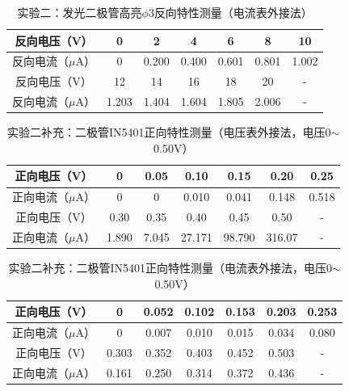 \documentclass[a4paper]{article}
\begin{document}
    \begin{table}[!ht]
        \caption{实验二：发光二极管高亮$\phi3$反向特性测量（电流表外接法）}\label{tab:exp4}
        \begin{tabularx}{\textwidth}{c*{6}{C}} \toprule
            反向电压（V） & 0 & 2 & 4 & 6 & 8 & 10 \\ \midrule
            反向电流（$\mu$A） & 0 & 0.200 & 0.400 & 0.601 & 0.801 & 1.002 \\ \midrule
            反向电压（V） & 12 & 14 & 16 & 18 & 20 & - \\ \midrule
            反向电流（$\mu$A） & 1.203 & 1.404 & 1.604 & 1.805 & 2.006 & - \\
        \bottomrule
        \end{tabularx}
    \end{table}
    \begin{table}[!ht]
        \caption{实验二补充：二极管IN5401正向特性测量（电压表外接法，电压0$\sim$0.50V）}\label{tab:exp4}
        \begin{tabularx}{\textwidth}{c*{6}{C}} \toprule
            正向电压（V） & 0 & 0.05 & 0.10 & 0.15 & 0.20 & 0.25 \\ \midrule
            正向电流（$\mu$A） & 0 & 0 & 0.010 & 0.041 & 0.148 & 0.518 \\ \midrule
            正向电压（V） & 0.30 & 0.35 & 0.40 & 0.45 & 0.50 & - \\ \midrule
            正向电流（$\mu$A） & 1.890 & 7.045 & 27.171 & 98.790 & 316.07 & - \\ 
        \bottomrule
        \end{tabularx}
    \end{table}
    \begin{table}[!ht]
        \caption{实验二补充：二极管IN5401正向特性测量（电流表外接法，电压0$\sim$0.50V）}\label{tab:exp4}
        \begin{tabularx}{\textwidth}{c*{6}{C}} \toprule
            正向电压（V） & 0 & 0.052 & 0.102 & 0.153 & 0.203 & 0.253 \\ \midrule
            正向电流（$\mu$A） & 0 & 0.007 & 0.010 & 0.015 & 0.034 & 0.080 \\ \midrule
            正向电压（V） & 0.303 & 0.352 & 0.403 & 0.452 & 0.503 & - \\ \midrule
            正向电流（$\mu$A） & 0.161 & 0.250 & 0.314 & 0.372 & 0.436 & - \\ 
        \bottomrule
        \end{tabularx}
    \end{table}
\end{document}
